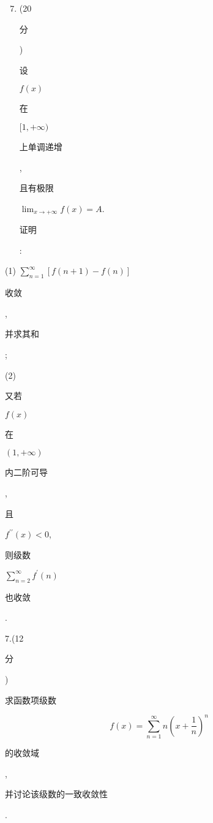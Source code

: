\documentclass[10pt]{article}
\begin{document}
\begin{enumerate}
  \setcounter{enumi}{6}
  \item (20 \begin{CJK}{UTF8}{mj}分\end{CJK}) \begin{CJK}{UTF8}{mj}设\end{CJK} $f(x)$ \begin{CJK}{UTF8}{mj}在\end{CJK} $[1,+\infty)$ \begin{CJK}{UTF8}{mj}上单调递增\end{CJK}, \begin{CJK}{UTF8}{mj}且有极限\end{CJK} $\lim _{x \rightarrow+\infty} f(x)=A$. \begin{CJK}{UTF8}{mj}证明\end{CJK}:
\end{enumerate}
(1) $\sum_{n=1}^{\infty}[f(n+1)-f(n)]$ \begin{CJK}{UTF8}{mj}收敛\end{CJK}, \begin{CJK}{UTF8}{mj}并求其和\end{CJK};

(2) \begin{CJK}{UTF8}{mj}又若\end{CJK} $f(x)$ \begin{CJK}{UTF8}{mj}在\end{CJK} $(1,+\infty)$ \begin{CJK}{UTF8}{mj}内二阶可导\end{CJK}, \begin{CJK}{UTF8}{mj}且\end{CJK} $f^{\prime \prime}(x)<0$, \begin{CJK}{UTF8}{mj}则级数\end{CJK} $\sum_{n=2}^{\infty} f^{\prime}(n)$ \begin{CJK}{UTF8}{mj}也收敛\end{CJK}.

7.(12 \begin{CJK}{UTF8}{mj}分\end{CJK}) \begin{CJK}{UTF8}{mj}求函数项级数\end{CJK}
$$
f(x)=\sum_{n=1}^{\infty} n\left(x+\frac{1}{n}\right)^{n}
$$
\begin{CJK}{UTF8}{mj}的收敛域\end{CJK}, \begin{CJK}{UTF8}{mj}并讨论该级数的一致收敛性\end{CJK}.
\end{document}

